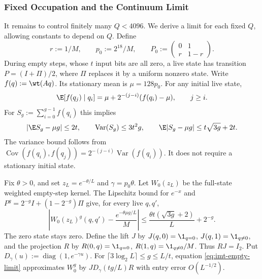 \subsubsection{Fixed Occupation and the Continuum Limit}
\label{app:imt-fixed}

It remains to control finitely many $Q<4096$. We derive a limit for each
fixed $Q$, allowing constants to depend on $Q$. Define
\[
 r:=1/M,\qquad p_0:=2^{18}/M,\qquad
 P_0:=\begin{pmatrix}0&1\\r&1-r\end{pmatrix}.
\]
During empty steps, whose $t$ input bits are all zero, a live state has transition $P=(I+\Pi)/2$, where
$\Pi$ replaces it by a uniform nonzero state. Write $f(q):=\wt(Aq)$.
Its stationary mean is $\mu=128p_0$. For any initial live state,
\[
 \E[f(q_j)\mid q_i]=\mu+2^{-(j-i)}(f(q_i)-\mu),\qquad j\ge i.
\]
For $S_g:=\sum_{i=0}^{g-1}f(q_i)$ this implies
\[
 |\E S_g-\mu g|\le2t,\qquad
 \operatorname{Var}(S_g)\le3t^2g,\qquad
 \E|S_g-\mu g|\le t\sqrt{3g}+2t.
\]
The variance bound follows from
$\operatorname{Cov}(f(q_i),f(q_j))=2^{-(j-i)}\operatorname{Var}(f(q_i))$.
It does not require a stationary initial state.

Fix $\theta>0$, and set $z_L=e^{-\theta/L}$ and $\gamma=p_0\theta$.
Let $W_0(z_L)$ be the full-state weighted empty-step kernel.
The Lipschitz bound for $e^{-x}$ and
$P^g=2^{-g}I+(1-2^{-g})\Pi$ give, for every live $q,q'$,
\begin{equation}
 \left|W_0(z_L)^g(q,q')-\frac{e^{-\theta\mu g/L}}M\right|
 \le\frac{\theta t(\sqrt{3g}+2)}L+2^{-g}.
 \label{eq:imt-empty-limit}
\end{equation}
The zero state stays zero. Define the lift $J$ by $J(q,0)=\1_{q=0}$,
$J(q,1)=\1_{q\ne0}$, and the projection $R$ by
$R(0,q)=\1_{q=0}$, $R(1,q)=\1_{q\ne0}/M$. Thus $RJ=I_2$.
Put $D_\gamma(u):=\operatorname{diag}(1,e^{-\gamma u})$.
For $\lceil3\log_2L\rceil\le g\le L/t$, equation
\eqref{eq:imt-empty-limit} approximates $W_0^g$ by
$JD_\gamma(tg/L)R$ with entry error $O(L^{-1/2})$.


